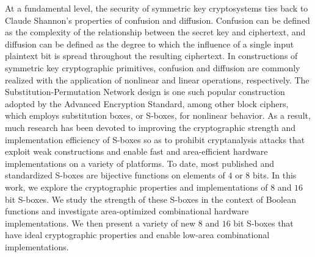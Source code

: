 \documentclass[11pt,american]{report}
\begin{document}
\begin{abstractpage}
At a fundamental level, the security of symmetric key cryptosystems ties back to Claude Shannon's properties of confusion and diffusion. Confusion can be defined as the complexity of the relationship between the secret key and ciphertext, and diffusion can be defined as the degree to which the influence of a single input plaintext bit is spread throughout the resulting ciphertext. In constructions of symmetric key cryptographic primitives, confusion and diffusion are commonly realized with the application of nonlinear and linear operations, respectively. The Substitution-Permutation Network design is one such popular construction adopted by the Advanced Encryption Standard, among other block ciphers, which employs substitution boxes, or S-boxes, for nonlinear behavior. As a result, much research has been devoted to improving the cryptographic strength and implementation efficiency of S-boxes so as to prohibit cryptanalysis attacks that exploit weak constructions and enable fast and area-efficient hardware implementations on a variety of platforms. To date, most published and standardized S-boxes are bijective functions on elements of $4$ or $8$ bits. In this work, we explore the cryptographic properties and implementations of $8$ and $16$ bit S-boxes. We study the strength of these S-boxes in the context of Boolean functions and investigate area-optimized combinational hardware implementations. We then present a variety of new $8$ and $16$ bit S-boxes that have ideal cryptographic properties and enable low-area combinational implementations. 
\end{abstractpage}



\afterpreface%

\end{document}
